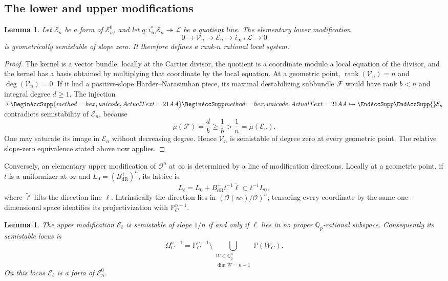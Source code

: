 \documentclass[11pt]{article}
\numberwithin{equation}{section}
\newtheorem{lemma}[theorem]{Lemma}
\theoremstyle{definition}
\theoremstyle{remark}
\newcommand{\Q}{\mathbb Q}
\newcommand{\cO}{\mathcal O}
\DeclareMathOperator{\rank}{rank}
\let\UnicodeOriginalHookrightarrow\hookrightarrow
\DeclareRobustCommand{\hookrightarrow}{
  \BeginAccSupp{method=hex,unicode,ActualText=21AA}
  \UnicodeOriginalHookrightarrow\EndAccSupp{}}
\begin{document}
\subsection{The lower and upper modifications}

\begin{lemma}\label{lem:lower-modification}
Let $\mathcal E_n$ be a form of $\mathcal E_n^0$, and let
$q:i_\infty^*\mathcal E_n\twoheadrightarrow\mathcal L$ be a quotient
line.  The elementary lower modification
\[
 0\longrightarrow\mathcal V_n\longrightarrow\mathcal E_n
 \longrightarrow i_{\infty *}\mathcal L\longrightarrow0
\]
is geometrically semistable of slope zero.  It therefore defines a
rank-$n$ rational local system.
\end{lemma}

\begin{proof}
The kernel is a vector bundle: locally at the Cartier divisor, the
quotient is a coordinate modulo a local equation of the divisor, and
the kernel has a basis obtained by multiplying that coordinate by the
local equation.  At a geometric point,
$\rank(\mathcal V_n)=n$ and $\deg(\mathcal V_n)=0$.
If it had a positive-slope Harder--Narasimhan piece, its maximal
destabilizing subbundle $\mathcal F$ would have rank $b<n$ and integral
degree $d\geq1$.  The injection $\mathcal F\hookrightarrow\mathcal E_n$
contradicts semistability of $\mathcal E_n$, because
\[
 \mu(\mathcal F)=\frac d b\geq\frac1b>\frac1n
       =\mu(\mathcal E_n).
\]
One may saturate its image in $\mathcal E_n$ without decreasing degree.
Hence $\mathcal V_n$ is semistable of degree zero at every geometric
point.  The relative slope-zero equivalence stated above now applies.
\end{proof}

Conversely, an elementary upper modification of $\cO^n$ at $\infty$
is determined by a line of modification directions.  Locally at a
geometric point, if $t$ is a uniformizer at $\infty$ and
$L_0=(B_{\mathrm{dR}}^+)^n$, its lattice is
\[
 L_\ell=L_0+B_{\mathrm{dR}}^+t^{-1}\widetilde\ell
       \subset t^{-1}L_0 ,
\]
where $\widetilde\ell$ lifts the direction line $\ell$.
Intrinsically the direction lies in
$(\cO(\infty)/\cO)^n$; tensoring every coordinate by the same
one-dimensional space identifies its projectivization with
$\mathbb P^{n-1}_C$.

\begin{lemma}\label{lem:drinfeld-locus}
The upper modification $\mathcal E_\ell$ is semistable of slope $1/n$
if and only if $\ell$ lies in no proper $\Q_p$-rational subspace.
Consequently its semistable locus is
\[
 \Omega_C^{n-1}
 =\mathbb P_C^{n-1}\setminus
       \bigcup_{\substack{W\subset\Q_p^n\\ \dim W=n-1}}\mathbb P(W_C).
\]
On this locus $\mathcal E_\ell$ is a form of $\mathcal E_n^0$.
\end{lemma}
\end{document}
